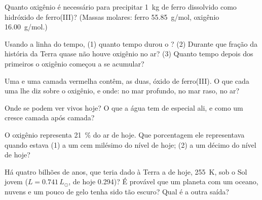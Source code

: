 \begin{exercise}[$\star\star$]\label{exo:g12:early-earth:7}
Quanto oxigênio é necessário para precipitar \qty{1}{kg} de ferro dissolvido
como hidróxido de ferro(III)? (Massas molares: ferro \qty{55.85}{g/mol},
oxigênio \qty{16.00}{g/mol}.)
\end{exercise}

\begin{exercise}[$\star\star$]\label{exo:g12:early-earth:8}
Usando a linha do tempo, (1) quanto tempo durou o ?
(2) Durante que fração da história da Terra quase não houve oxigênio no ar?
(3) Quanto tempo depois dos primeiros  o oxigênio começou a se
acumular?
\end{exercise}

\begin{exercise}[$\star\star$]\label{exo:g12:early-earth:9}
Uma  e uma camada vermelha contêm, as duas, óxido
de ferro(III). O que cada uma lhe diz sobre o oxigênio, e onde: no mar
profundo, no mar raso, no ar?
\end{exercise}

\begin{exercise}[$\star\star$]\label{exo:g12:early-earth:10}
Onde se podem ver  vivos hoje? O que a água tem de especial
ali, e como um  cresce camada após camada?
\end{exercise}

\begin{exercise}[$\star\star$]\label{exo:g12:early-earth:11}
O oxigênio representa \qty{21}{\percent} do ar de hoje. Que porcentagem ele
representava quando estava (1) a um cem milésimo do nível de hoje; (2) a um
décimo do nível de hoje?
\end{exercise}

\begin{exercise}[$\star\star\star$]\label{exo:g12:early-earth:12}
Há quatro bilhões de anos, que  teria dado à Terra a  de hoje, \qty{255}{K}, sob o Sol jovem ($L = 0.741\,L_\odot$,
 de hoje 0.294)? É provável que um planeta com um oceano, nuvens e um
pouco de gelo tenha sido tão escuro? Qual é a outra saída?
\end{exercise}

